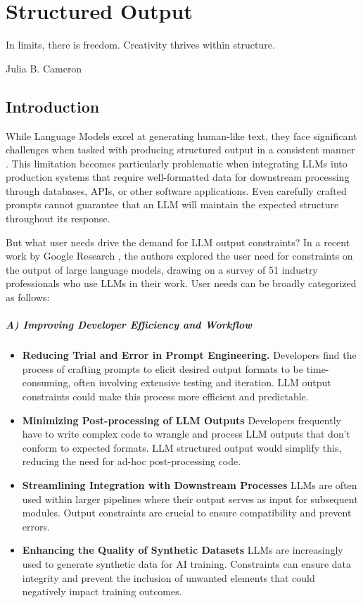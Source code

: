 \setchapterpreamble[u]{\margintoc}
\chapter{Structured Output}
\label{chapter:output}

\epigraph{In limits, there is freedom. Creativity thrives within structure.}{Julia B. Cameron}

\section{Introduction}

While Language Models excel at generating human-like text, they face significant challenges when tasked with producing structured output in a consistent manner \cite{tang2024strucbenchlargelanguagemodels, shorten2024structuredragjsonresponseformatting}. This limitation becomes particularly problematic when integrating LLMs into production systems that require well-formatted data for downstream processing through databases, APIs, or other software applications. Even carefully crafted prompts cannot guarantee that an LLM will maintain the expected structure throughout its response.

But what user needs drive the demand for LLM output constraints? In a recent work by Google Research , the authors explored the user need for constraints on the output of large language models, drawing on a survey of 51 industry professionals who use LLMs in their work. User needs can be broadly categorized as follows:

\paragraph{A) Improving Developer Efficiency and Workflow}
\begin{itemize}
    \item \textbf{Reducing Trial and Error in Prompt Engineering.} Developers find the process of crafting prompts to elicit desired output formats to be time-consuming, often involving extensive testing and iteration. LLM output constraints could make this process more efficient and predictable.
    \item \textbf{Minimizing Post-processing of LLM Outputs}
Developers frequently have to write complex code to wrangle and process LLM outputs that don't conform to expected formats. LLM structured output would simplify this, reducing the need for ad-hoc post-processing code.
    \item \textbf{Streamlining Integration with Downstream Processes}
LLMs are often used within larger pipelines where their output serves as input for subsequent modules. Output constraints are crucial to ensure compatibility and prevent errors.
    \item \textbf{Enhancing the Quality of Synthetic Datasets}
LLMs are increasingly used to generate synthetic data for AI training. Constraints can ensure data integrity and prevent the inclusion of unwanted elements that could negatively impact training outcomes.
\end{itemize}

